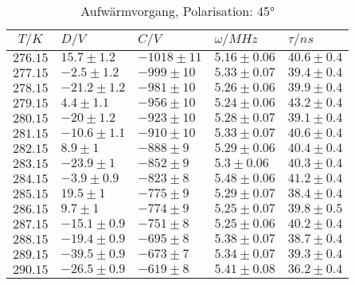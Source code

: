 \begin{table}[h!]
\scriptsize\centering
\begin{tabular}{|c|l|l|l|l|}
\hline
$T/K$&$D/V$&$C/V$&$\omega/MHz$&$\tau/ns$\\\hline\hline
$276.15$&$15.7\pm1.2$&$-1018\pm11$&$5.16\pm0.06$&$40.6\pm0.4$\\\hline
$277.15$&$-2.5\pm1.2$&$-999\pm10$&$5.33\pm0.07$&$39.4\pm0.4$\\\hline
$278.15$&$-21.2\pm1.2$&$-981\pm10$&$5.26\pm0.06$&$39.9\pm0.4$\\\hline
$279.15$&$4.4\pm1.1$&$-956\pm10$&$5.24\pm0.06$&$43.2\pm0.4$\\\hline
$280.15$&$-20\pm1.2$&$-923\pm10$&$5.28\pm0.07$&$39.1\pm0.4$\\\hline
$281.15$&$-10.6\pm1.1$&$-910\pm10$&$5.33\pm0.07$&$40.6\pm0.4$\\\hline
$282.15$&$8.9\pm1$&$-888\pm9$&$5.29\pm0.06$&$40.4\pm0.4$\\\hline
$283.15$&$-23.9\pm1$&$-852\pm9$&$5.3\pm0.06$&$40.3\pm0.4$\\\hline
$284.15$&$-3.9\pm0.9$&$-823\pm8$&$5.48\pm0.06$&$41.2\pm0.4$\\\hline
$285.15$&$19.5\pm1$&$-775\pm9$&$5.29\pm0.07$&$38.4\pm0.4$\\\hline
$286.15$&$9.7\pm1$&$-774\pm9$&$5.25\pm0.07$&$39.8\pm0.5$\\\hline
$287.15$&$-15.1\pm0.9$&$-751\pm8$&$5.25\pm0.06$&$40.2\pm0.4$\\\hline
$288.15$&$-19.4\pm0.9$&$-695\pm8$&$5.38\pm0.07$&$38.7\pm0.4$\\\hline
$289.15$&$-39.5\pm0.9$&$-673\pm7$&$5.34\pm0.07$&$39.3\pm0.4$\\\hline
$290.15$&$-26.5\pm0.9$&$-619\pm8$&$5.41\pm0.08$&$36.2\pm0.4$\\\hline
\end{tabular}
\caption{Aufwärmvorgang, Polarisation: 45°\label{warm45}}
\end{table}
